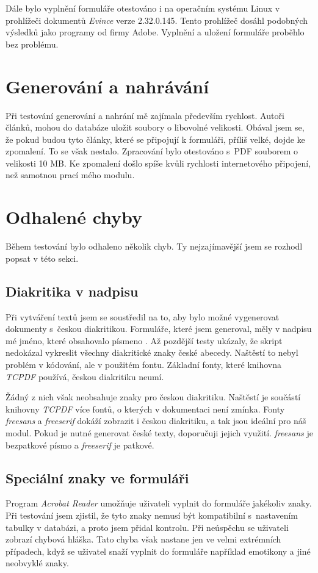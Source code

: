 \documentclass[czech,BP]{thesiskiv}
\begin{document}
Dále bylo vyplnění formuláře otestováno i na operačním systému Linux v prohlížeči dokumentů \emph{Evince} verze 2.32.0.145. Tento prohlížeč dosáhl podobných výsledků jako programy od firmy Adobe. Vyplnění a uložení formuláře proběhlo bez problému.
\section{Generování a nahrávání}
Při testování generování a nahrání mě zajímala především rychlost. Autoři článků, mohou do databáze uložit soubory o libovolné velikosti. Obával jsem se, že pokud budou tyto články, které se připojují k formuláři, příliš velké, dojde ke zpomalení. To se však nestalo. Zpracování bylo otestováno s~PDF souborem o velikosti 10 MB. Ke zpomalení došlo spíše kvůli rychlosti internetového připojení, než samotnou prací mého modulu. 
\section{Odhalené chyby}
Během testování bylo odhaleno několik chyb. Ty nejzajímavější jsem se rozhodl popsat v této sekci.
\subsection{Diakritika v nadpisu}
Při vytváření textů jsem se soustředil na to, aby bylo možné vygenerovat dokumenty s~českou diakritikou. Formuláře, které jsem generoval, měly v nadpisu mé jméno, které obsahovalo písmeno . Až pozdější testy ukázaly, že skript nedokázal vykreslit všechny diakritické znaky české abecedy. Naštěstí to nebyl problém v kódování, ale v použitém fontu. Základní fonty, které knihovna \emph{TCPDF} používá, českou diakritiku neumí.

Žádný z nich však neobsahuje znaky pro českou diakritiku. Naštěstí je součástí knihovny \emph{TCPDF} více fontů, o kterých v dokumentaci není zmínka. Fonty \emph{freesans} a \emph{freeserif} dokáží zobrazit i českou diakritiku, a tak jsou ideální pro náš modul. Pokud je nutné generovat české texty, doporučuji jejich využití. \emph{freesans} je bezpatkové písmo a \emph{freeserif} je patkové.
\subsection{Speciální znaky ve formuláři}
Program \emph{Acrobat Reader} umožňuje uživateli vyplnit do formuláře jakékoliv znaky. Při testování jsem zjistil, že tyto znaky nemusí být kompatibilní s~nastavením tabulky v databázi, a proto jsem přidal kontrolu. Při neúspěchu se uživateli zobrazí chybová hláška. Tato chyba však nastane jen ve velmi extrémních případech, když se uživatel snaží vyplnit do formuláře například emotikony a jiné neobvyklé znaky. 
\end{document}
